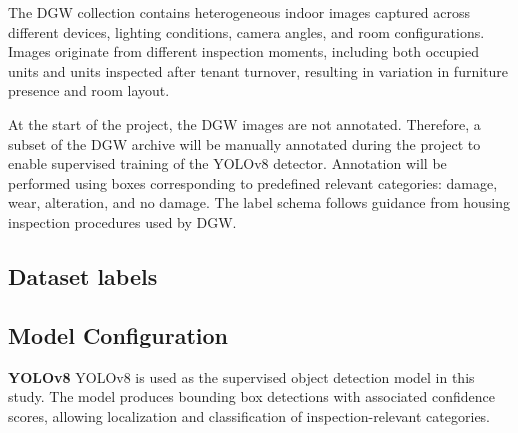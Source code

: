The DGW collection contains heterogeneous indoor images captured across different devices, lighting conditions, camera angles, and room configurations. Images originate from different inspection moments, including both occupied units and units inspected after tenant turnover, resulting in variation in furniture presence and room layout.

At the start of the project, the DGW images are not annotated. Therefore, a subset of the DGW archive will be manually annotated during the project to enable supervised training of the YOLOv8 detector. Annotation will be performed using boxes corresponding to predefined relevant categories: damage, wear, alteration, and no damage. The label schema follows guidance from housing inspection procedures used by DGW.

\subsection{Dataset labels}

\begin{table}[H]
\centering
\small


\caption{Datasets and labels used in the experiments.}
\label{tab:dataset_usage}
\end{table}

\subsection{Model Configuration}
\textbf{YOLOv8}
YOLOv8 is used as the supervised object detection model in this study. The model produces bounding box detections with associated confidence scores, allowing localization and classification of inspection-relevant categories. 

